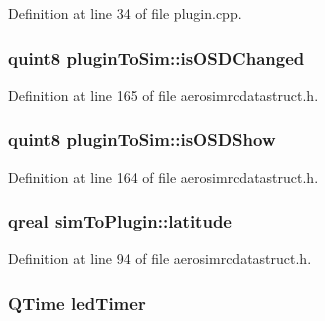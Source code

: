 \-Definition at line 34 of file plugin.\-cpp.

\hypertarget{group___aero_sim_r_c_gaa416deb314c63406b7320311d1cf71d7}{
\subsubsection[{is\-O\-S\-D\-Changed}]{\setlength{\rightskip}{0pt plus 5cm}quint8 {\bf plugin\-To\-Sim\-::is\-O\-S\-D\-Changed}}}\label{group___aero_sim_r_c_gaa416deb314c63406b7320311d1cf71d7}


\-Definition at line 165 of file aerosimrcdatastruct.\-h.

\hypertarget{group___aero_sim_r_c_ga35a2acc4730f500b87b19630f57c14ed}{
\subsubsection[{is\-O\-S\-D\-Show}]{\setlength{\rightskip}{0pt plus 5cm}quint8 {\bf plugin\-To\-Sim\-::is\-O\-S\-D\-Show}}}\label{group___aero_sim_r_c_ga35a2acc4730f500b87b19630f57c14ed}


\-Definition at line 164 of file aerosimrcdatastruct.\-h.

\hypertarget{group___aero_sim_r_c_ga53209d2be245073a24064614cb7c2ce2}{
\subsubsection[{latitude}]{\setlength{\rightskip}{0pt plus 5cm}qreal {\bf sim\-To\-Plugin\-::latitude}}}\label{group___aero_sim_r_c_ga53209d2be245073a24064614cb7c2ce2}


\-Definition at line 94 of file aerosimrcdatastruct.\-h.

\hypertarget{group___aero_sim_r_c_ga56b5b977fe04df5bdb2e4ea63b385692}{
\subsubsection[{led\-Timer}]{\setlength{\rightskip}{0pt plus 5cm}\-Q\-Time {\bf led\-Timer}}}\label{group___aero_sim_r_c_ga56b5b977fe04df5bdb2e4ea63b385692}


